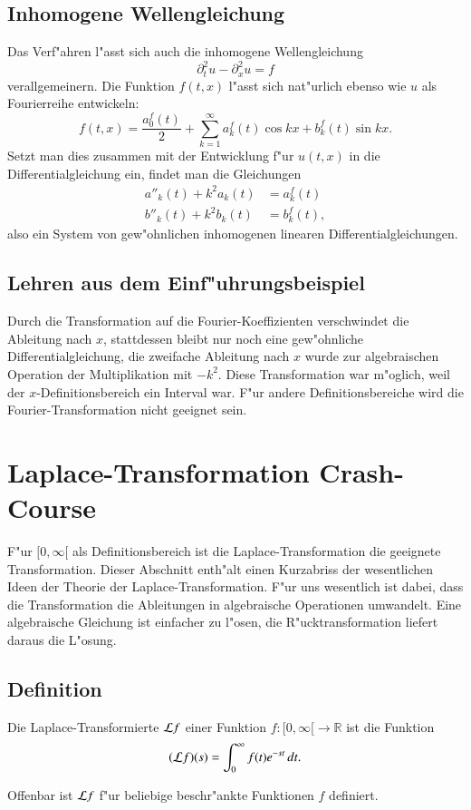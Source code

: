 \subsection{Inhomogene Wellengleichung}
Das Verf"ahren l"asst sich auch die inhomogene Wellengleichung
\[
\partial_t^2u-\partial_x^2u=f
\]
verallgemeinern. Die Funktion $f(t,x)$ l"asst sich nat"urlich ebenso wie
$u$ als Fourierreihe entwickeln:
\[
f(t,x)=\frac{a_0^f(t)}2+\sum_{k=1}^\infty a_k^f(t)\cos kx+b_k^f(t)\sin kx.
\]
Setzt man dies zusammen mit der Entwicklung f"ur $u(t,x)$ in die
Differentialgleichung ein, findet man die Gleichungen
\begin{align*}
a''_k(t)+k^2a_k(t)&=a_k^f(t)\\
b''_k(t)+k^2b_k(t)&=b_k^f(t),
\end{align*}
also ein System von gew"ohnlichen inhomogenen linearen Differentialgleichungen.

\subsection{Lehren aus dem Einf"uhrungsbeispiel}
Durch die Transformation auf die Fourier-Koeffizienten verschwindet die
Ableitung nach $x$,  stattdessen bleibt nur noch eine gew"ohnliche
Differentialgleichung, die zweifache Ableitung nach $x$ wurde zur
algebraischen Operation der Multiplikation mit $-k^2$. Diese Transformation
war m"oglich, weil der $x$-Definitionsbereich ein Interval war.
F"ur andere Definitionsbereiche wird die Fourier-Transformation nicht
geeignet sein.

\section{Laplace-Transformation Crash-Course}
F"ur $[0,\infty[$ als Definitionsbereich ist die Laplace-Transformation
die geeignete Transformation. Dieser Abschnitt enth"alt einen Kurzabriss
der wesentlichen Ideen der Theorie der Laplace-Transformation.
F"ur uns wesentlich ist dabei, dass die Transformation die Ableitungen
in algebraische Operationen umwandelt. Eine algebraische Gleichung ist
einfacher zu l"osen, die R"ucktransformation liefert daraus die L"osung.

\subsection{Definition}
\begin{definition}
Die Laplace-Transformierte ${\cal L}f$ einer Funktion
$f\colon[0,\infty[\to\mathbb R$ ist die Funktion
\[
({\cal L}f)(s)=\int_0^\infty f(t)e^{-st}\,dt.
\]
\end{definition}
Offenbar ist ${\cal L}f$ f"ur beliebige beschr"ankte Funktionen $f$ definiert.


